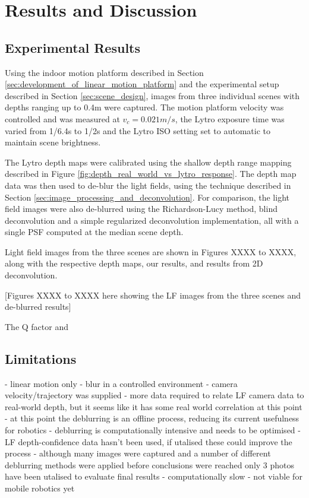 
\chapter{Results and Discussion}
\label{chap:results_and_discussion}

\section{Experimental Results}
\label{sec:experimental_results}

Using the indoor motion platform described in Section \ref{sec:development_of_linear_motion_platform} and the experimental setup described in Section \ref{sec:scene_design}, images from three individual scenes with depths ranging up to \nicetilde0.4m were captured.
The motion platform velocity was controlled and was measured at $v_c = 0.021m/s$, the Lytro exposure time was varied from 1/6.4s to 1/2s and the Lytro ISO setting set to automatic to maintain scene brightness.

The Lytro depth maps were calibrated using the shallow depth range mapping described in Figure \ref{fig:depth_real_world_vs_lytro_response}.
The depth map data was then used to de-blur the light fields, using the technique described in Section \ref{sec:image_processing_and_deconvolution}.
For comparison, the light field images were also de-blurred using the Richardson-Lucy method, blind deconvolution and a simple regularized deconvolution implementation, all with a single PSF computed at the median scene depth.

Light field images from the three scenes are shown in Figures XXXX to XXXX, along with the respective depth maps, our results, and results from 2D deconvolution.

[Figures XXXX to XXXX here showing the LF images from the three scenes and de-blurred results]

The Q factor and 


\section{Limitations}
\label{sec:limitations}
- linear motion only
- blur in a controlled environment
- camera velocity/trajectory was supplied
- more data required to relate LF camera data to real-world depth, but it seems like it has some real world correlation at this point
- at this point the deblurring is an offline process, reducing its current usefulness for robotics
- deblurring is computationally intensive and needs to be optimised
- LF depth-confidence data hasn't been used, if utalised these could improve the process
- although many images were captured and a number of different deblurring methods were applied before conclusions were reached only 3 photos have been utalised to evaluate final results
- computationally slow 
- not viable for mobile robotics yet


